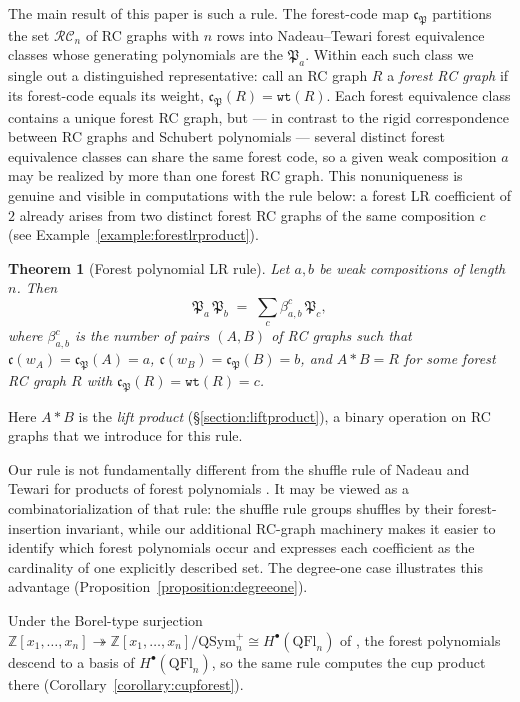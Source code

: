 \documentclass{amsart}
\newtheorem{theorem}{Theorem}[section]
\theoremstyle{definition}
\theoremstyle{remark}
\numberwithin{equation}{subsection}
\newcommand{\wof}[1]{w_{#1}}
\newcommand{\wtt}{\mathtt{wt}}
\newcommand{\RC}{\mathcal{RC}}
\newcommand{\code}{\mathfrak{c}}
\newcommand{\forest}{\mathfrak{P}}
\begin{document}
The main result of this paper is such a rule. The forest-code map $\code_\forest$ partitions the set $\RC_n$ of RC graphs with $n$ rows into Nadeau--Tewari forest equivalence classes whose generating polynomials are the $\forest_a$. Within each such class we single out a distinguished representative: call an RC graph $R$ a \emph{forest RC graph} if its forest-code equals its weight, $\code_\forest(R) = \wtt(R)$. Each forest equivalence class contains a unique forest RC graph, but --- in contrast to the rigid correspondence between RC graphs and Schubert polynomials --- several distinct forest equivalence classes can share the same forest code, so a given weak composition $a$ may be realized by more than one forest RC graph. This nonuniqueness is genuine and visible in computations with the rule below: a forest LR coefficient of $2$ already arises from two distinct forest RC graphs of the same composition $c$ (see Example~\ref{example:forestlrproduct}).

\begin{theorem}[Forest polynomial LR rule]\label{theorem:forestpolyLR}
Let $a,b$ be weak compositions of length $n$. Then
$$\forest_a\,\forest_b \;=\; \sum_c \beta_{a,b}^c\,\forest_c,$$
where $\beta_{a,b}^c$ is the number of pairs $(A,B)$ of RC graphs such that $\code(\wof{A}) = \code_\forest(A) = a$, $\code(\wof{B}) = \code_\forest(B) = b$, and $A*B = R$ for some forest RC graph $R$ with $\code_\forest(R) = \wtt(R) = c$.
\end{theorem}
Here $A*B$ is the \emph{lift product} (\S\ref{section:liftproduct}), a binary operation on RC graphs that we introduce for this rule.

Our rule is not fundamentally different from the shuffle rule of Nadeau and Tewari for products of forest polynomials \cite[\S6]{nadeau2024forest}. It may be viewed as a combinatorialization of that rule: the shuffle rule groups shuffles by their forest-insertion invariant, while our additional RC-graph machinery makes it easier to identify which forest polynomials occur and expresses each coefficient as the cardinality of one explicitly described set. The degree-one case illustrates this advantage (Proposition~\ref{proposition:degreeone}).

Under the Borel-type surjection $\mathbb{Z}[x_1,\ldots,x_n]\twoheadrightarrow \mathbb{Z}[x_1,\ldots,x_n]/\mathrm{QSym}_n^+\cong H^\bullet(\mathrm{QFl}_n)$ of \cite{bergeron2025qsymflag}, the forest polynomials descend to a basis of $H^\bullet(\mathrm{QFl}_n)$, so the same rule computes the cup product there (Corollary~\ref{corollary:cupforest}).
\end{document}
